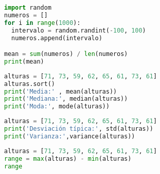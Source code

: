 \documentclass{article}
\begin{document}
\begin{lstlisting}[language=Python]
import random
numeros = []
for i in range(1000):
  intervalo = random.randint(-100, 100)
  numeros.append(intervalo)

mean = sum(numeros) / len(numeros)
print(mean)
\end{lstlisting}

\begin{lstlisting}[language=Python]
alturas = [71, 73, 59, 62, 65, 61, 73, 61]
alturas.sort()
print('Media:' , mean(alturas))
print('Mediana:', median(alturas))
print('Moda:', mode(alturas))
\end{lstlisting}

\begin{lstlisting}[language=Python]
alturas = [71, 73, 59, 62, 65, 61, 73, 61]
print('Desviación típica:', std(alturas))
print('Varianza:',variance(alturas))
\end{lstlisting}

\begin{lstlisting}[language=Python]
alturas = [71, 73, 59, 62, 65, 61, 73, 61]
range = max(alturas) - min(alturas)
range
\end{lstlisting}
\end{document}
